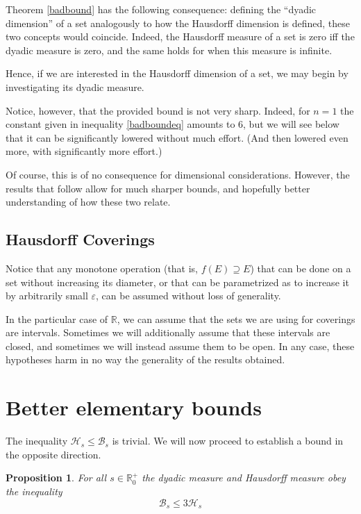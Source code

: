 \documentclass[11pt, reqno]{amsart}
\newcommand{\R}{\mathbb{R}}
\newcommand{\HH}{\mathcal{H}}
\newcommand{\BB}{\mathcal{B}}
\newtheorem{prop}{Proposition}
\begin{document}
Theorem \ref{badbound} has the following consequence: defining the ``dyadic dimension'' of a set analogously to how the Hausdorff dimension is defined, these two concepts would coincide. Indeed, the Hausdorff measure of a set is zero iff the dyadic measure is zero, and the same holds for when this measure is infinite.

Hence, if we are interested in the Hausdorff dimension of a set, we may begin by investigating its dyadic measure.

Notice, however, that the provided bound is not very sharp. Indeed, for $n = 1$ the constant given in inequality \eqref{badboundeq} amounts to 6, but we will see below that it can be significantly lowered without much effort. (And then lowered even more, with significantly more effort.)

Of course, this is of no consequence for dimensional considerations. However, the results that follow allow for much sharper bounds, and hopefully better understanding of how these two relate.

\subsection{Hausdorff Coverings}

Notice that any monotone operation (that is, $f(E) \supseteq E$) that can be done on a set without increasing its diameter, or that can be parametrized as to increase it by arbitrarily small $\varepsilon$, can be assumed without loss of generality.

In the particular case of $\R$, we can assume that the sets we are using for coverings are intervals. Sometimes we will additionally assume that these intervals are closed, and sometimes we will instead assume them to be open. In any case, these hypotheses harm in no way the generality of the results obtained.

\section{Better elementary bounds}

The inequality $\HH_s \leq \BB_s$ is trivial. We will now proceed to establish a bound in the opposite direction.

\begin{prop}\label{easybound} For all $s \in \R^+_0$ the dyadic measure and Hausdorff measure obey the inequality
\begin{equation}\label{easyboundeq}
\BB_s \leq 3 \HH_s
\end{equation}
\end{prop}
\end{document}
